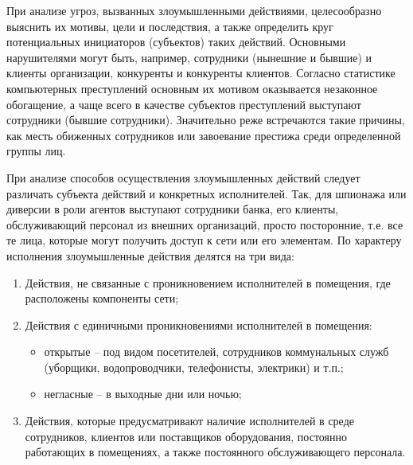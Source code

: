 При анализе угроз, вызванных злоумышленными действиями, целесообразно выяснить
их мотивы, цели и последствия, а также определить круг потенциальных инициаторов
(субъектов) таких действий. Основными нарушителями могут быть, например,
сотрудники (нынешние и бывшие) и клиенты организации, конкуренты и конкуренты клиентов.
Согласно статистике компьютерных преступлений основным их мотивом оказывается
незаконное обогащение, а чаще всего в качестве субъектов преступлений выступают
сотрудники (бывшие сотрудники). Значительно реже встречаются такие причины, как
месть обиженных сотрудников или завоевание престижа среди определенной группы
лиц.~\cite{zapechnikov}

При анализе способов осуществления злоумышленных действий следует различать
субъекта действий и конкретных исполнителей. Так, для шпионажа или диверсии в
роли агентов выступают сотрудники банка, его клиенты, обслуживающий персонал из
внешних организаций, просто посторонние, т.е. все те лица, которые могут
получить доступ к сети или его элементам.
По характеру исполнения злоумышленные действия делятся на три вида:
\begin{enumerate}
  \item Действия, не связанные с проникновением исполнителей в помещения, где
  расположены компоненты сети;
  \item Действия с единичными проникновениями исполнителей в помещения:
  \begin{itemize}
    \item открытые -- под видом посетителей, сотрудников коммунальных служб
    (уборщики, водопроводчики, телефонисты, электрики) и т.п.;
	\item негласные -- в выходные дни или ночью;
  \end{itemize}
  \item Действия, которые предусматривают наличие исполнителей в среде
  сотрудников, клиентов или поставщиков оборудования, постоянно работающих в
  помещениях, а также постоянного обслуживающего персонала.
\end{enumerate}        
 
 
 